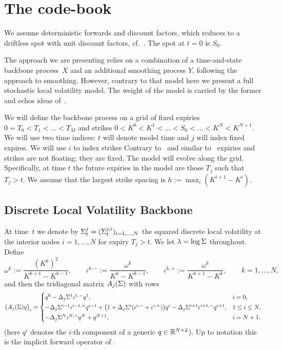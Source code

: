\section{The code-book}\label{sec:setup}

We assume deterministic forwards and discount factors, which reduces to a driftless spot
with unit discount factors, cf.~\cite{BuehlerVolAndDivs}. The spot at $t=0$ is $S_0$.

The approach we are presenting relies on a combination of a time-and-state 
backbone process~$X$ and an additional smoothing process $Y$, following the~\cite{SANOS2026} approach to smoothing. However, contrary
to that model here we present a full stochastic local volatility model. The weight of the model is carried
by the former and echos ideas of~\cite{Wissel2007}.

We will define the backbone process on a grid of fixed expiries $0=T_0< T_1<\dots<T_M$ and strikes $0< K^0< K^1<\dots<S_0<\dots<K^N<K^{N+1}$.
We will use two time indices: $t$ will denote model time and $j$ will index fixed expires. We will use $i$ to index strikes
Contrary to~\cite{SANOS2026} and similar to~\cite{Wissel2007} expiries and strikes are not floating; they are fixed. The model will evolve
along the grid. Specifically, at time $t$ the future expiries in the model are those $T_j$ such that $T_j>t$. We assume that 
the largest strike spacing is $h:=\max_i(K^{i+1}-K^i)$.

\subsection{Discrete Local Volatility Backbone}

At time~$t$ we denote by $\Sigma^j_t= (\Sigma^{j,i}_t)_{i=1,\dots,N}$ the squared discrete local volatility at the
interior nodes $i=1,\dots,N$ for expiry $T_j > t$. We let $\lambda=\log\Sigma$
throughout. Define
\begin{equation}\label{eq:weights}
  \omega^k:=\frac{(K^k)^{2}}{K^{k+1}-K^{k-1}},\qquad
  \iota^{k,-}:=\frac{\omega^k}{K^k-K^{k-1}},\qquad
  \iota^{k,+}:=\frac{\omega^k}{K^{k+1}-K^k},
  \qquad k=1,\dots,N,
\end{equation}
and then the tridiagonal matrix $A_j(\Sigma)$ with rows
\begin{equation}\label{eq:operator}
  \bigl(A_j(\Sigma)q\bigr)_i=
  \begin{cases}
    q^0-\Delta_j\Sigma^1\iota^{1,-}q^1, & i=0,\\[2pt]
    -\Delta_j\Sigma^{i-1}\iota^{i-1,+}q^{i-1}
     +\bigl(1+\Delta_j\Sigma^i(\iota^{i,-}+\iota^{i,+})\bigr)q^i
     -\Delta_j\Sigma^{i+1}\iota^{i+1,-}q^{i+1}, & 1\le i\le N,\\[2pt]
    -\Delta_j\Sigma^N\iota^{N,+}q^N+q^{N+1}, & i=N+1 .
  \end{cases}
\end{equation}
(here $q^i$ denotes the $i$-th component of a generic $q\in\mathbb R^{N+2}$).
Up to notation this is the implicit forward operator of \cite{BuehlerRyskin2016}.

